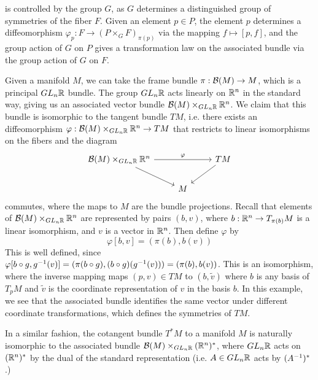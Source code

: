 is controlled by the group $G$, as $G$ determines a distinguished
group of symmetries of the fiber $F$. Given an element $p \in P$, the element
$p$ determines a diffeomorphism $\varphi_p : F \to (P \times_G F)_{\pi(p)}$ via the
mapping $f \mapsto [p,f]$, and the group action of $G$ on $P$ gives a
transformation law on the associated bundle via the group action of $G$ on $F$.
%
\begin{exmp}
Given a manifold $M$, we can take the frame bundle $\pi : \mathcal{B}(M) \to M$, which is a
principal $GL_n\mathbb{R}$ bundle. The group $GL_n\mathbb{R}$ acts linearly on $\mathbb{R}^n$ in the
standard way, giving us an associated vector bundle $\mathcal{B}(M) \times_{GL_n\mathbb{R}} \mathbb{R}^n$.
We claim that this bundle is isomorphic to the tangent bundle $TM$, i.e. there
exists an diffeomorphism $\varphi : \mathcal{B}(M) \times_{GL_n\mathbb{R}} \mathbb{R}^n \to TM$ that
restricts to linear isomorphisms on the fibers and the diagram
\[\begin{tikzcd}
\B(M) \times_{GL_n\R} \R^n \ar[rr, "\varphi"] \ar[dr] && TM \ar[dl] \\
& M
\end{tikzcd}\]
commutes, where the maps to $M$ are the bundle projections. Recall that
elements of $\mathcal{B}(M) \times_{GL_n\mathbb{R}} \mathbb{R}^n$ are represented by pairs $(b, v)$,
where $b: \mathbb{R}^n \to T_{\pi(b)}M$ is a linear isomorphism, and $v$ is a vector in $\mathbb{R}^n$.
Then define $\varphi$ by
\[
 \varphi[b,v] = (\pi(b), b(v))
\]
This is well defined, since $\varphi[b\circ g, g^{-1}(v)] = (\pi(b \circ g),
(b\circ g)(g^{-1}(v))) = (\pi(b), b(v))$. This is an isomorphism, where the
inverse mapping maps $(p,v) \in TM$ to $(b, \tilde{v})$ where $b$ is any
basis of $T_pM$ and $\tilde{v}$ is the coordinate representation of $v$ in the
basis $b$. In this example, we see that the associated bundle identifies the same vector
under different coordinate transformations, which defines the symmetries of
$TM$.
\end{exmp}
%
In a similar fashion, the cotangent bundle $T^*M$ to a manifold $M$ is
naturally isomorphic to the associated bundle $\mathcal{B}(M) \times_{GL_n\mathbb{R}} (\mathbb{R}^n)^*$,
where $GL_n\mathbb{R}$ acts on $(\mathbb{R}^n)^*$ by the dual of the standard representation
(i.e. $A \in GL_n\mathbb{R}$ acts by $(A^{-1})^*$.) \\
%

